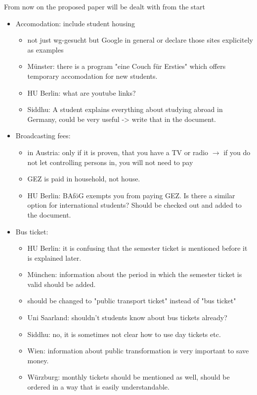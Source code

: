     From now on the proposed paper will be dealt with from the start
      \begin{itemize}
        \item Accomodation: include student housing
          \begin{itemize}
            \item not just wg-gesucht but Google in general or declare those sites explicitely as examples
            \item Münster: there is a program "eine Couch für Ersties" which offers temporary accomodation for new students.
            \item HU Berlin: what are youtube links?
            \item Siddhu: A student explains everything about studying abroad in Germany, could be very useful -> write that in the document.
          \end{itemize}
        \item Broadcasting fees:
          \begin{itemize}
            \item in Austria: only if it is proven, that you have a TV or radio $\rightarrow$ if you do not let controlling persons in, you will not need to pay
            \item GEZ is paid in household, not house.
            \item HU Berlin: BAföG exempts you from paying GEZ. Is there a similar option for international students? Should be checked out and added to the document.
          \end{itemize}
        \item Bus ticket:
          \begin{itemize}
            \item HU Berlin: it is confusing that the semester ticket is mentioned before it is explained later.
            \item München: information about the period in which the semester ticket is valid should be added.
            \item should be changed to "public transport ticket" instead of "bus ticket"
            \item Uni Saarland: shouldn't students know about bus tickets already?
            \item Siddhu: no, it is sometimes not clear how to use day tickets etc.
            \item Wien: information about public transformation is very important to save money.
            \item Würzburg: monthly tickets should be mentioned as well, should be ordered in a way that is easily understandable.

\end{itemize}
\end{itemize}
